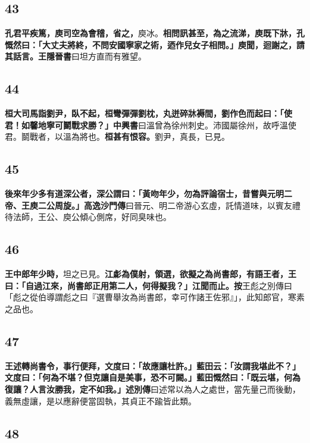 \subsection*{43}

\textbf{孔君平疾篤，庾司空為會稽，省之，}{\footnotesize 庾冰。}\textbf{相問訊甚至，為之流涕，庾既下牀，孔慨然曰：「大丈夫將終，不問安國寧家之術，迺作兒女子相問。」庾聞，迴謝之，請其話言。}{\footnotesize \textbf{王隱晉書}曰坦方直而有雅望。}

\subsection*{44}

\textbf{桓大司馬詣劉尹，臥不起，桓彎彈彈劉枕，丸迸碎牀褥間，劉作色而起曰：「使君！如馨地寧可鬬戰求勝？」}{\footnotesize \textbf{中興書}曰溫曾為徐州刺史。沛國屬徐州，故呼溫使君。鬬戰者，以溫為將也。}\textbf{桓甚有恨容。}{\footnotesize 劉尹，真長，已見。}

\subsection*{45}

\textbf{後來年少多有道深公者，深公謂曰：「黃吻年少，勿為評論宿士，昔嘗與元明二帝、王庾二公周旋。」}{\footnotesize \textbf{高逸沙門傳}曰晉元、明二帝游心玄虛，託情道味，以賓友禮待法師，王公、庾公傾心側席，好同臭味也。}

\subsection*{46}

\textbf{王中郎年少時，}{\footnotesize 坦之已見。}\textbf{江虨為僕射，領選，欲擬之為尚書郎，有語王者，王曰：「自過江來，尚書郎正用第二人，何得擬我？」江聞而止。}{\footnotesize \textbf{按}王彪之別傳曰「彪之從伯導謂彪之曰『選曹舉汝為尚書郎，幸可作諸王佐邪』」，此知郎官，寒素之品也。}

\subsection*{47}

\textbf{王述轉尚書令，事行便拜，文度曰：「故應讓杜許。」藍田云：「汝謂我堪此不？」文度曰：「何為不堪？但克讓自是美事，恐不可闕。」藍田慨然曰：「既云堪，何為復讓？人言汝勝我，定不如我。」}{\footnotesize \textbf{述別傳}曰述常以為人之處世，當先量己而後動，義無虛讓，是以應辭便當固執，其貞正不踰皆此類。}

\subsection*{48}

